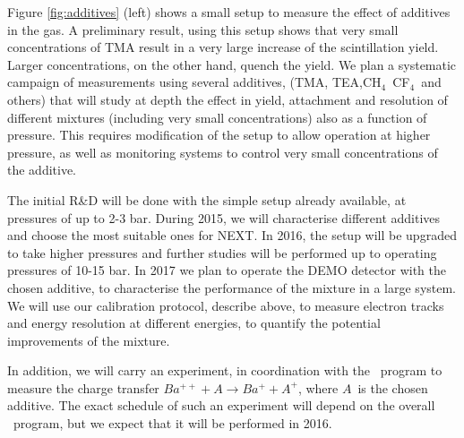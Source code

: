 Figure \ref{fig:additives} (left) shows a small setup to measure the effect of additives in the gas. A preliminary result, using this setup shows that very small concentrations of TMA result in a very large increase of the scintillation yield. Larger concentrations, on the other hand, quench the yield. We plan a systematic campaign of measurements using several additives, (TMA, TEA,CH$_4$~CF$_4$~and others) that will study at depth the effect in yield, attachment and resolution of different mixtures (including very small concentrations) also as a function of pressure. This requires modification of the setup to allow operation at higher pressure, as well as monitoring systems to control very small concentrations of the additive. 

The initial R\&D will be done with the simple setup already available, at pressures of up to 2-3 bar. During 2015, we will characterise different additives and choose the most suitable ones for NEXT. In 2016, the setup will be upgraded to take higher pressures and further studies will be performed up to operating pressures of 10-15 bar. In 2017 we plan to operate the DEMO detector with the chosen additive, to characterise the performance of the mixture in a large system. We will use our calibration protocol, describe above, to measure electron tracks and energy resolution at different energies, to quantify the potential improvements of the mixture. 

In addition, we will carry an experiment, in coordination with the \BATA\ program  to measure the charge transfer $Ba^{++} + A \rightarrow Ba^{+} + A^{+}$, where $A$~is the chosen additive. The exact schedule of such an experiment will depend on the overall \BATA\ program, but we expect that it will be performed in 2016.